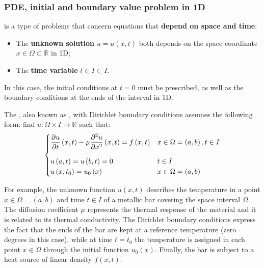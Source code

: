 \subsubsection{PDE, initial and boundary value problem in 1D}

 is a type of problems that concern equations that \textbf{depend on space and time}:
\begin{itemize}
    \item The \textbf{unknown solution} $u = u\left(x,t\right)$ both depends on the space coordinate $x \in \Omega \subset \mathbb{R}$ in 1D;
    
    \item The \textbf{time variable} $t \in I \subset I$.
\end{itemize}
In this case, the initial conditions at $t = 0$ must be prescribed, as well as the boundary conditions at the ends of the interval in 1D.

\highspace
The , also known as , with Dirichlet boundary conditions assumes the following form: find $u: \Omega \times I \rightarrow \mathbb{R}$ such that:
\begin{equation}\label{eq: heat equation}
    \begin{cases}
        \dfrac{\partial u}{\partial t}\left(x,t\right) - \mu \dfrac{\partial^{2}u}{\partial x^{2}}\left(x,t\right) = f\left(x,t\right) & x \in \Omega = \left(a,b\right), t \in I \vspace{1em} \\
        u\left(a,t\right) = u\left(b,t\right) = 0 & t \in I \\
        u\left(x, t_{0}\right) = u_{0}\left(x\right) & x \in \Omega = \left(a,b\right)
    \end{cases}
\end{equation}

\begin{examplebox}
    For example, the unknown function $u \left(x,t\right)$ describes the temperature in a point $x \in \Omega = \left(a,b\right)$ and time $t \in I$ of a metallic bar covering the space interval $\Omega$. The diffusion coefficient $\mu$ represents the thermal response of the material and it is related to its thermal conductivity. The Dirichlet boundary conditions express the fact that the ends of the bar are kept at a reference temperature (zero degrees in this case), while at time $t = t_{0}$ the temperature is assigned in each point $x \in \Omega$ through the initial function $u_{0}\left(x\right)$. Finally, the bar is subject to a heat source of linear density $f\left(x,t\right)$.
\end{examplebox}